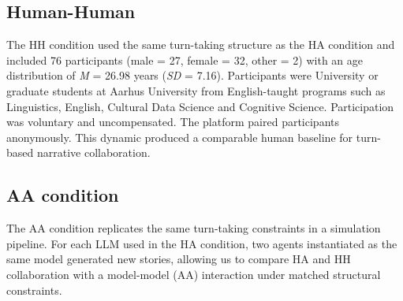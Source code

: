 \documentclass[11pt]{article}
\begin{document}
\subsection{Human-Human} 
The HH condition used the same turn-taking structure as the HA condition and included 76 participants (male = 27, female = 32, other = 2) with an age distribution of \textit{M} = 26.98 years (\textit{SD} = 7.16). 
Participants were University or graduate students at Aarhus University from English-taught programs such as Linguistics, English, Cultural Data Science and Cognitive Science. Participation was voluntary and uncompensated. %
The platform paired participants anonymously. This dynamic produced a comparable human baseline for turn-based narrative collaboration.

\subsection{AA condition}
The AA condition replicates the same turn-taking constraints in a simulation pipeline. For each LLM used in the HA condition, two agents instantiated as the same model generated new stories, allowing us to compare HA and HH collaboration with a model-model (AA) interaction under matched structural constraints. 
\end{document}
